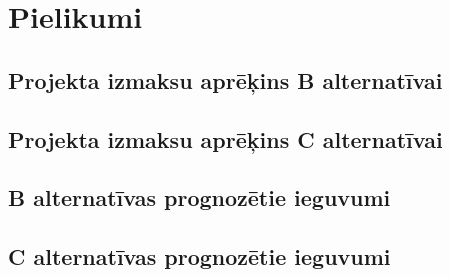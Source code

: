 \appendix
\chapter*{Pielikumi}
\renewcommand{\thesection}{\arabic{section}}
    
    
    
    
    
    
\section{Projekta izmaksu aprēķins B alternatīvai}
\label{app:B_izmaksas}
    \begin{figure}
        \centering 
        
    \end{figure}
    \clearpage
    \begin{figure}
        \centering 
        
    \end{figure}
    \clearpage
\section{Projekta izmaksu aprēķins C alternatīvai}
	\label{app:C_izmaksas}
    \begin{figure}
        \centering 
        
    \end{figure}
    \clearpage
\section{B alternatīvas prognozētie ieguvumi}
	\label{app:B_ienemumi}
    \begin{figure}
        \centering 
        
    \end{figure}
    \clearpage
\section{C alternatīvas prognozētie ieguvumi}
    \label{app:C_ienemumi}
    \begin{figure}
        \centering 
        
    \end{figure}
    \clearpage
